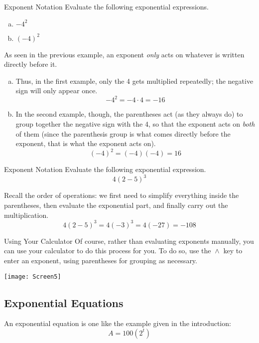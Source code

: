 \begin{example}{Exponent Notation}
Evaluate the following exponential expressions.
\begin{enumerate}[(a)]
\item $-4^2$
\item $(-4)^2$
\end{enumerate}

\sol
As seen in the previous example, an exponent \emph{only} acts on whatever is written directly before it.

\begin{enumerate}[(a)]
\item Thus, in the first example, only the 4 gets multiplied repeatedly; the negative sign will only appear once.
\[-4^2 = - 4 \cdot 4 = \boxed{-16}\]
\item In the second example, though, the parentheses act (as they always do) to group together the negative sign with the 4, so that the exponent acts on \emph{both} of them (since the parenthesis group is what comes directly before the exponent, that is what the exponent acts on).
\[(-4)^2 = (-4)(-4) = \boxed{16}\]
\end{enumerate}
\end{example}

\begin{example}{Exponent Notation}
Evaluate the following exponential expression.
\[4(2-5)^3\]

\sol
Recall the order of operations: we first need to simplify everything inside the parentheses, then evaluate the exponential part, and finally carry out the multiplication.
\[4(2-5)^3 = 4(-3)^3 = 4(-27) = \boxed{-108}\]
\end{example}

\begin{proc}{Using Your Calculator}
Of course, rather than evaluating exponents manually, you can use your calculator to do this process for you.  To do so, use the $\boxed{\wedge}$ key to enter an exponent, using parentheses for grouping as necessary.
\begin{center}
\texttt{[image: Screen5]}
\end{center}
\end{proc}

\subsection{Exponential Equations}

An exponential equation is one like the example given in the introduction: \[A = 100\left(2^t\right)\]

